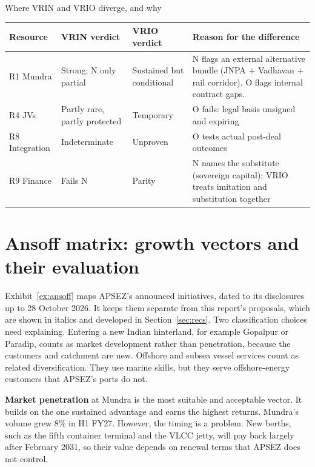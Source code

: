 \documentclass[12pt, a4paper]{article}
\newcommand{\tablesetup}{\footnotesize\renewcommand{\arraystretch}{1.25}\setlength{\tabcolsep}{4pt}}
\newcommand{\rowsep}{\addlinespace[3pt]}
\begin{document}
\begin{exhibit}[!htbp]
\caption{Where VRIN and VRIO diverge, and why}\label{ex:diverge}
{\tablesetup
\begin{tabularx}{\linewidth}{P{24mm}P{36mm}P{32mm}L}
\toprule
\textbf{Resource} & \textbf{VRIN verdict} & \textbf{VRIO verdict} & \textbf{Reason for the difference} \\
\midrule
R1 Mundra & Strong; N only partial & Sustained but conditional & N flags an external alternative bundle (JNPA + Vadhavan + rail corridor). O flags internal contract gaps. \\ \rowsep
R4 JVs & Partly rare, partly protected & Temporary & O fails: legal basis unsigned and expiring \\ \rowsep
R8 Integration & Indeterminate & Unproven & O tests actual post-deal outcomes \\ \rowsep
R9 Finance & Fails N & Parity & N names the substitute (sovereign capital); VRIO treats imitation and substitution together \\
\bottomrule
\end{tabularx}}
\end{exhibit}

\section{Ansoff matrix: growth vectors and their evaluation}\label{sec:ansoff}
Exhibit~\ref{ex:ansoff} maps APSEZ's announced initiatives, dated to its
disclosures up to 28 October 2026. It keeps them separate from this report's
proposals, which are shown in italics and developed in
Section~\ref{sec:recs}. Two classification choices need explaining. Entering a
new Indian hinterland, for example Gopalpur or Paradip, counts as market
development rather than penetration, because the customers and catchment are
new. Offshore and subsea vessel services count as related diversification. They
use marine skills, but they serve offshore-energy customers that APSEZ's ports
do not.

\textbf{Market penetration} at Mundra is the most suitable and acceptable
vector. It builds on the one sustained advantage and earns the highest returns.
Mundra's volume grew 8\% in H1 FY27. However, the timing is a problem. New
berths, such as the fifth container terminal and the VLCC jetty, will pay back
largely after February 2031, so their value depends on renewal terms that APSEZ
does not control.
\end{document}
